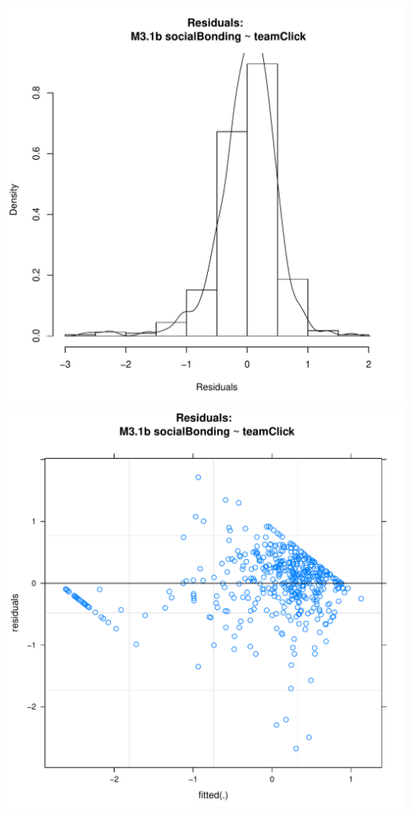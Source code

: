 \documentclass[12pt]{report}
\begin{document}
\newpage
\centering

\newpage
\centering


\newpage
\centering
\includegraphics[scale =.4]{../images/MLM31bHist.pdf}
\includegraphics[scale =.4]{../images/MLM31bScatter.pdf}
\end{document}

